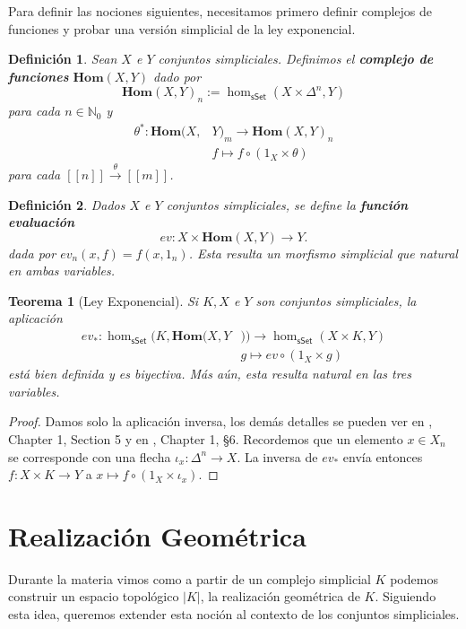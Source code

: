 \documentclass[11pt]{report}
\theoremstyle{colored}
\newtheorem{definition}{Definición}[section]
\newtheorem{theorem}{Teorema}[section]
\newcommand{\N}{\mathbb{N}}
\newcommand{\nat}[1]{[\![#1]\!]}
\newcommand{\ord}[1]{\nat{#1}}
\newcommand{\cat}[1]{\mathsf{#1}}
\renewcommand{\ss}[1]{\Delta^{#1}}
\newcommand{\homcomplex}{\mathbf{Hom}}
\begin{document}
Para definir las nociones siguientes, necesitamos primero definir complejos de funciones y probar una versión simplicial de la ley exponencial.

\begin{definition} Sean $X$ e $Y$ conjuntos simpliciales. Definimos el \textbf{complejo de funciones} $\homcomplex(X,Y)$ dado por
\[
\homcomplex(X,Y)_n := \hom_{\cat{sSet}}(X \times \ss{n},Y)
\]
para cada $n \in \N_0$ y 
\begin{align*}
\theta^* : \homcomplex(X,&Y)_m \to \homcomplex(X,Y)_n \\
&f \longmapsto f \circ (1_X \times \theta)
\end{align*}
para cada $\ord{n} \xrightarrow{\theta} \ord{m}$.
\end{definition}

\begin{definition} Dados $X$ e $Y$ conjuntos simpliciales, se define la \textbf{función evaluación}
\[
ev : X \times \homcomplex(X,Y) \to Y.
\]
dada por $ev_n(x,f) = f(x,1_n)$. Esta resulta un morfismo simplicial que natural en ambas variables.
\end{definition}

\begin{theorem}[Ley Exponencial] Si $K,X$ e $Y$ son conjuntos simpliciales, la aplicación
\begin{align*}
ev_* : \hom_{\cat{sSet}}(K,\homcomplex(X,Y&)) \to \hom_{\cat{sSet}}(X \times K,Y)\\
&g \longmapsto ev \circ (1_X \times g)
\end{align*}
está bien definida y es biyectiva. Más aún, esta resulta natural en las tres variables.
\end{theorem}
\begin{proof} Damos solo la aplicación inversa, los demás detalles se pueden ver en \cite{GJ}, Chapter 1, Section 5 y en \cite{M}, Chapter 1, \S 6. Recordemos que un elemento $x \in X_n$ se corresponde con una flecha $\iota_x : \ss{n} \to X$. La inversa de $ev_*$ envía entonces $f : X \times K \to Y$ a $x \mapsto f \circ (1_X \times \iota_x)$.
\end{proof}

\section{Realización Geométrica}

Durante la materia vimos como a partir de un complejo simplicial $K$ podemos construir un espacio topológico $|K|$, la realización geométrica de $K$. Siguiendo esta idea, queremos extender esta noción al contexto de los conjuntos simpliciales.
\end{document}
